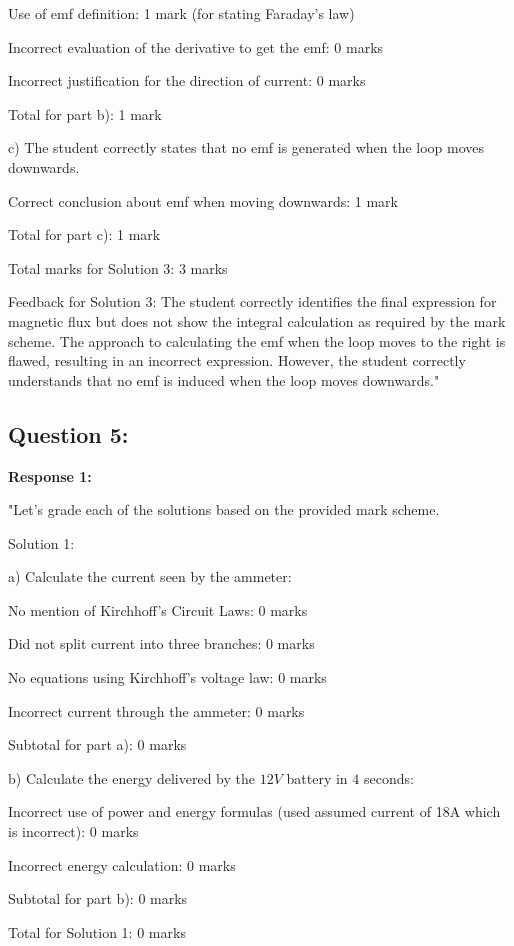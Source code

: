 \documentclass[a4paper,11pt]{article}
\begin{document}
Use of emf definition: 1 mark (for stating Faraday's law)

Incorrect evaluation of the derivative to get the emf: 0 marks

Incorrect justification for the direction of current: 0 marks

Total for part b): 1 mark

c) The student correctly states that no emf is generated when the loop moves downwards.

Correct conclusion about emf when moving downwards: 1 mark

Total for part c): 1 mark

Total marks for Solution 3: 3 marks

Feedback for Solution 3:
The student correctly identifies the final expression for magnetic flux but does not show the integral calculation as required by the mark scheme. The approach to calculating the emf when the loop moves to the right is flawed, resulting in an incorrect expression. However, the student correctly understands that no emf is induced when the loop moves downwards."

\subsection*{Question 5:}

\textbf{Response 1:}

"Let's grade each of the solutions based on the provided mark scheme.

Solution 1:

a) Calculate the current seen by the ammeter:

No mention of Kirchhoff’s Circuit Laws: 0 marks

Did not split current into three branches: 0 marks

No equations using Kirchhoff’s voltage law: 0 marks

Incorrect current through the ammeter: 0 marks

Subtotal for part a): 0 marks

b) Calculate the energy delivered by the 
\(12 V\) battery in \(4\) seconds:

Incorrect use of power and energy formulas (used assumed current of 18A which is incorrect): 0 marks

Incorrect energy calculation: 0 marks

Subtotal for part b): 0 marks

Total for Solution 1: 0 marks
\end{document}
